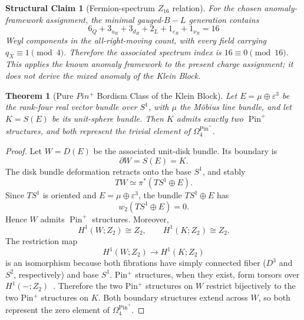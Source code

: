 \documentclass[11pt]{article}
\theoremstyle{canonmath}
\newtheorem{theorem}{Theorem}[section]
\theoremstyle{canonpostulate}
\theoremstyle{canonclaim}
\newtheorem{structuralclaim}{Structural Claim}[section]
\providecommand{\Klein}{\mathcal{K}}
\providecommand{\Ztwo}{\mathbb{Z}_2}
\providecommand{\Sone}{S^1}
\providecommand{\Pin}{\operatorname{Pin}}
\def\mathrm#1{#1}%
\def\mathbb#1{#1}%
\def\mathcal#1{#1}%
\begin{document}
\begin{structuralclaim}[Fermion-spectrum $\mathbb Z_{16}$ relation] \label{claim:16}
For the chosen anomaly-framework assignment, the minimal gauged-$B-L$ generation contains
\begin{equation}
6_Q+3_{u_R}+3_{d_R}+2_L+1_{e_R}+1_{\nu_R}=16
\end{equation}
Weyl components in the all-right-moving count, with every field carrying $q_X\equiv1\pmod4$. Therefore the associated spectrum index is $16\equiv0\pmod{16}$. This applies the known anomaly framework to the present charge assignment; it does not derive the mixed anomaly of the Klein Block.
\end{structuralclaim}

\begin{theorem}[Pure $\mathrm{Pin}^+$ Bordism Class of the Klein Block] \label{thm:pintrivial}
Let $E=\mu\oplus\varepsilon^3$ be the rank-four real vector bundle over $\Sone$, with $\mu$ the M\"obius line bundle, and let $\Klein=S(E)$ be its unit-sphere bundle. Then $\Klein$ admits exactly two $\Pin^+$ structures, and both represent the trivial element of $\Omega_4^{\Pin^+}$.
\end{theorem}
\begin{proof}
Let $W=D(E)$ be the associated unit-disk bundle. Its boundary is
\begin{equation}
\partial W=S(E)=\Klein.
\end{equation}
The disk bundle deformation retracts onto the base $\Sone$, and stably
\begin{equation}
TW\simeq\pi^*(T\Sone\oplus E).
\end{equation}
Since $T\Sone$ is oriented and $E=\mu\oplus\varepsilon^3$, the bundle $T\Sone\oplus E$ has
\begin{equation}
w_2(T\Sone\oplus E)=0.
\end{equation}
Hence $W$ admits $\Pin^+$ structures. Moreover,
\begin{equation}
H^1(W;\Ztwo)\cong\Ztwo,
\qquad
H^1(\Klein;\Ztwo)\cong\Ztwo.
\end{equation}
The restriction map
\begin{equation}
H^1(W;\Ztwo)\longrightarrow H^1(\Klein;\Ztwo)
\end{equation}
is an isomorphism because both fibrations have simply connected fiber ($D^3$ and $S^2$, respectively) and base $\Sone$. Pin$^+$ structures, when they exist, form torsors over $H^1(-;\Ztwo)$~\cite{KirbyTaylor}. Therefore the two Pin$^+$ structures on $W$ restrict bijectively to the two Pin$^+$ structures on $\Klein$. Both boundary structures extend across $W$, so both represent the zero element of $\Omega_4^{\Pin^+}$.
\end{proof}
\end{document}
